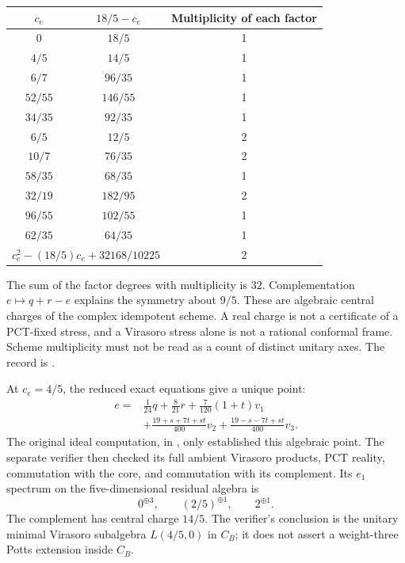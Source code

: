 \begin{center}
\begin{tabular}{@{}ccc@{}}
\toprule
$c_e$&$18/5-c_e$&Multiplicity of each factor\\
\midrule
$0$&$18/5$&1\\
$4/5$&$14/5$&1\\
$6/7$&$96/35$&1\\
$52/55$&$146/55$&1\\
$34/35$&$92/35$&1\\
$6/5$&$12/5$&2\\
$10/7$&$76/35$&2\\
$58/35$&$68/35$&1\\
$32/19$&$182/95$&2\\
$96/55$&$102/55$&1\\
$62/35$&$64/35$&1\\
\midrule
\multicolumn{2}{c}{$c_e^2-(18/5)c_e+32168/10225$}&2\\
\bottomrule
\end{tabular}
\end{center}
The sum of the factor degrees with multiplicity is $32$.
Complementation $e\mapsto q+r-e$ explains the symmetry about
$9/5$. These are algebraic central charges of the complex idempotent
scheme. A real charge is not a certificate of a PCT-fixed stress,
and a Virasoro stress alone is not a rational conformal frame.
Scheme multiplicity must not be read as a count of distinct unitary
axes. The record is
.

At $c_e=4/5$, the reduced exact equations give a unique point:
\begin{align*}
 e={}&\frac1{24}q+\frac8{21}r
      +\frac7{120}(1+t)v_1\\
 &+\frac{19+s+7t+st}{400}v_2
      +\frac{19-s-7t+st}{400}v_3.
\end{align*}
The original ideal computation, in
,
only established this algebraic point. The separate verifier
then checked its full ambient Virasoro products, PCT reality,
commutation with the core, and commutation with its complement.
Its $e_1$ spectrum on the five-dimensional residual algebra is
\[
 0^{\oplus3},\qquad (2/5)^{\oplus1},\qquad 2^{\oplus1}.
\]
The complement has central charge $14/5$. The verifier's conclusion
is the unitary minimal Virasoro subalgebra $L(4/5,0)$ in $C_B$;
it does not assert a weight-three Potts extension inside $C_B$.

